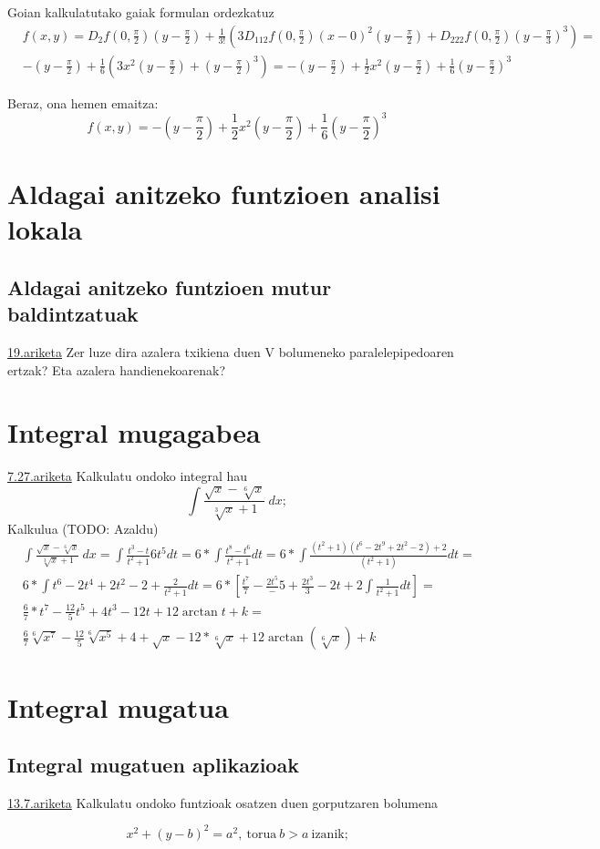 Goian kalkulatutako gaiak formulan ordezkatuz
\begin{align*}
    &f(x,y)=D_2f(0,\frac{\pi}{2})\left(y-\frac{\pi}{2}\right)+\frac{1}{3!}\left(3D_{112}f(0,\frac{\pi}{2})(x-0)^2(y-\frac{\pi}{2})+ D_{222}f(0,\frac{\pi}{2})(y-\frac{\pi}{3})^3 \right)=\\
    &-\left(y-\frac{\pi}{2}\right)+\frac{1}{6}\left(3x^2(y-\frac{\pi}{2})+(y-\frac{\pi}{2})^3\right)=-\left(y-\frac{\pi}{2}\right)+\frac{1}{2}x^2\left(y-\frac{\pi}{2}\right)+\frac{1}{6}\left(y-\frac{\pi}{2}\right)^3
\end{align*}

Beraz, ona hemen emaitza:
\begin{equation*}
    \boxed{f(x,y)=-\left(y-\frac{\pi}{2}\right)+\frac{1}{2}x^2\left(y-\frac{\pi}{2}\right)+\frac{1}{6}\left(y-\frac{\pi}{2}\right)^3}
\end{equation*}

\chapter{Aldagai anitzeko funtzioen analisi lokala}
\section{Aldagai anitzeko funtzioen mutur baldintzatuak}
\underline{19.ariketa} Zer luze dira azalera txikiena duen V bolumeneko paralelepipedoaren ertzak? Eta azalera handienekoarenak?



\chapter{Integral mugagabea}
\underline{7.27.ariketa} Kalkulatu ondoko integral hau
\begin{equation*}
    \int \frac{\sqrt{x}-\sqrt[6]{x}}{\sqrt[3]{x}+1}\ dx;
\end{equation*}
Kalkulua (TODO: Azaldu)
\begin{equation*}
    \begin{split}
    &\int \frac{\sqrt{x}-\sqrt[6]{x}}{\sqrt[3]{x}+1}\ dx = \int \frac{t^3-t}{t^2+1}6t^5dt = 6 * \int \frac{t^8-t^6}{t^2+1}dt =
     6 * \int \frac{(t^2+1)(t^6-2t^9+2t^2-2)+2}{(t^2+1)}dt = & 
     \\ &6 * \int t^6-2t^4+2t^2-2+\frac{2}{t^2+1}dt = 6 * [\frac{t^7}{7}-\frac{2t^5}-{5}+\frac{2t^3}{3}-2t+2\int \frac{1}{t^2+1}dt] = &
     \\ & \frac{6}{7} * t^7 - \frac{12}{5}t^5+4t^3-12t+12\arctan{t} + k = &
     \\ &\frac{6}{7} \sqrt[6]{x^7}-\frac{12}{5}\sqrt[6]{x^5}+4+\sqrt{x}-12*\sqrt[6]{x}+12\arctan{(\sqrt[6]{x})}+k&
    \end{split}
\end{equation*}




\chapter{Integral mugatua}
\section{Integral mugatuen aplikazioak}
\underline{13.7.ariketa} Kalkulatu ondoko funtzioak osatzen duen gorputzaren bolumena

\begin{equation*}
    x^2+(y-b)^2=a^2,\ \text{torua}\ b>a \ \text{izanik;}
\end{equation*}